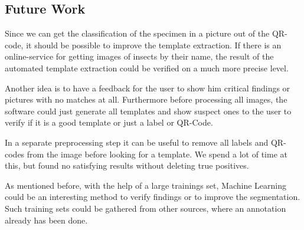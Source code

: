 \subsection{Future Work}
Since we can get the classification of the specimen in a picture out of the QR-code, it should be possible to improve the template extraction.
If there is an online-service for getting images of insects by their name, the result of the automated template extraction could be verified on a much more precise level.

Another idea is to have a feedback for the user to show him critical findings or pictures with no matches at all.
Furthermore before processing all images, the software could just generate all templates and show suspect ones to the user to verify if it is a good template or just a label or QR-Code.

In a separate preprocessing step it can be useful to remove all labels and QR-codes from the image before looking for a template.
We spend a lot of time at this, but found no satisfying results without deleting true positives.

As mentioned before, with the help of a large trainings set, Machine Learning could be an interesting method to verify findings or to improve the segmentation.
Such training sets could be gathered from other sources, where an annotation already has been done.
